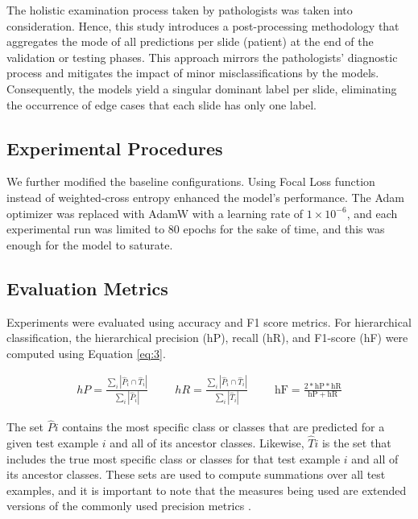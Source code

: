 \documentclass[runningheads]{llncs}
\begin{document}
The holistic examination process taken by pathologists was taken into consideration. Hence, this study introduces a post-processing methodology that aggregates the mode of all predictions per slide (patient) at the end of the validation or testing phases. This approach mirrors the pathologists' diagnostic process and mitigates the impact of minor misclassifications by the models. Consequently, the models yield a singular dominant label per slide, eliminating the occurrence of edge cases that each slide has only one label.

\subsection{Experimental Procedures}

We further modified the baseline configurations. Using Focal Loss function instead of weighted-cross entropy enhanced the model's performance. The Adam optimizer was replaced with AdamW with a learning rate of $1\times10^{-6}$, and each experimental run was limited to 80 epochs for the sake of time, and this was enough for the model to saturate.

\subsection{Evaluation Metrics}

Experiments were evaluated using accuracy and F1 score metrics. For hierarchical classification, the hierarchical precision (hP), recall (hR), and F1-score (hF) were computed using Equation \ref{eq:3}.

\begin{align} \label{eq:3}
hP=\frac{\sum_i\left|\hat{P}_i \cap \widehat{T}_i\right|}{\sum_i\left|\hat{P}_i\right|}
\hspace{1cm}hR=\frac{\sum_i\left|\widehat{P}_i \cap \widehat{T}_i\right|}{\sum_i\left|\widehat{T}_i\right|}
\hspace{1cm}\mathrm{hF}=\frac{2 * \mathrm{hP} * \mathrm{hR}}{\mathrm{hP}+\mathrm{hR}}
\end{align}

The set $\hat{P}{i}$ contains the most specific class or classes that are predicted for a given test example $i$ and all of its ancestor classes. Likewise, $\widehat{T}{i}$ is the set that includes the true most specific class or classes for that test example $i$ and all of its ancestor classes. These sets are used to compute summations over all test examples, and it is important to note that the measures being used are extended versions of the commonly used precision metrics \cite{silla2011survey}.
\end{document}
